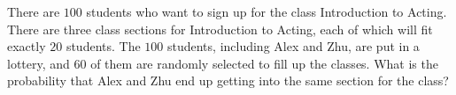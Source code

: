 There are $100$ students who want to sign up for the class Introduction to Acting. There are three class sections for Introduction to Acting, each of which will fit exactly $20$ students. The $100$ students, including Alex and Zhu, are put in a lottery, and 60 of them are randomly selected to fill up the classes. What is the probability that Alex and Zhu end up getting into the same section for the class?